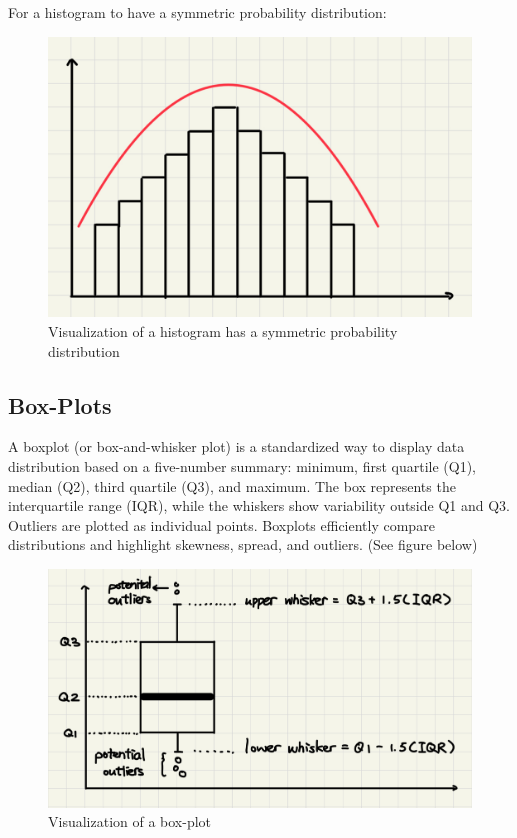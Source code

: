 For a histogram to have a symmetric probability distribution:

\begin{figure}[H]
 \centering
 \includegraphics[scale=0.25]{Section1/img/HisS.jpg}
 \caption{Visualization of a histogram has a symmetric probability distribution}
\end{figure} 

\subsection{Box-Plots}
A boxplot (or box-and-whisker plot) is a standardized way to display data distribution based on a five-number summary: minimum, first quartile (Q1), median (Q2), third quartile (Q3), and maximum. The box represents the interquartile range (IQR), while the whiskers show variability outside Q1 and Q3. Outliers are plotted as individual points. Boxplots efficiently compare distributions and highlight skewness, spread, and outliers. (See figure below)

\begin{figure}[H]
 \centering
 \includegraphics[scale=0.25]{Section1/img/BoxPlot.jpg}
 \caption{Visualization of a box-plot}
\end{figure} 

